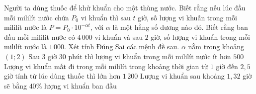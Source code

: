 \begin{ex}%
 Người ta dùng thuốc để khử khuẩn cho một thùng nước. Biết rằng nếu lúc đầu mỗi mililít nước chứa $P_0$ vi khuẩn thì sau $t$ giờ, số lượng vi khuấn trong mỗi mililít nước là $P=P_0 \cdot 10^{-\alpha t}$, với $\alpha$ là một hằng số dương nào đó. Biết rằng ban đầu mỗi mililit nước có $4\,000$  vi khuẩn và sau $2$ giờ, số lượng vi khuẩn trong mỗi mililít nước là $1\,000$. Xét tính Đúng Sai các mệnh đề sau.
  \choiceTF
  {$\alpha$ nằm trong  khoảng $\left(1;2\right)$}
  {\True Sau $3$ giờ $30$ phút thì lượng vi khuẩn trong mỗi  mililít nước ít hơn $500$}
  {\True Lượng vi khuẩn mất đi trong mỗi mililít trong khoảng thời gian từ $1$ giờ đến $2{,}5$ giờ  tính từ lúc dùng thuốc thì lớn hơn $1\,200$}
  {\True Lượng vi khuẩn sau khoảng $1{,}32$ giờ sẽ bằng $40\%$ lượng vi khuẩn  ban đầu}
\end{ex}

